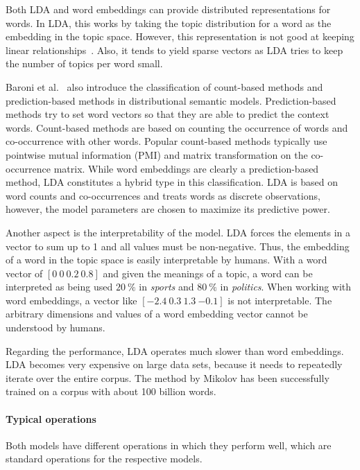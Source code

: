 \documentclass[
        a4paper,
        titlepage,
        twoside,
        parskip
        ]{scrbook}
\theoremstyle{break}
\begin{document}
Both LDA and word embeddings can provide distributed representations for words.
In LDA, this works by taking the topic distribution for a word as the embedding in the topic space.
However, this representation is not good at keeping linear relationships~\cite{Mikolov2013b,Mikolov2013a}.
Also, it tends to yield sparse vectors as LDA tries to keep the number of topics per word small.

Baroni et al.~\cite{Baroni2014} also introduce the classification of count-based methods and prediction-based methods in distributional semantic models.
Prediction-based methods try to set word vectors so that they are able to predict the context words.
Count-based methods are based on counting the occurrence of words and co-occurrence with other words.
Popular count-based methods typically use pointwise mutual information (PMI) and matrix transformation on the co-occurrence matrix.
While word embeddings are clearly a prediction-based method, LDA constitutes a hybrid type in this classification.
LDA is based on word counts and co-occurrences and treats words as discrete observations, however, the model parameters are chosen to maximize its predictive power.

Another aspect is the interpretability of the model.
LDA forces the elements in a vector to sum up to 1 and all values must be non-negative.
Thus, the embedding of a word in the topic space is easily interpretable by humans.
With a word vector of $[0~0~0.2~0.8]$ and given the meanings of a topic, a word can be interpreted as being used $20~\%$ in \emph{sports} and $80~\%$ in \emph{politics}.
When working with word embeddings, a vector like $[{-2.4}~0.3~1.3~{-0.1}]$ is not interpretable.
The arbitrary dimensions and values of a word embedding vector cannot be understood by humans.

Regarding the performance, LDA operates much slower than word embeddings.
LDA becomes very expensive on large data sets, because it needs to repeatedly iterate over the entire corpus.
The method by Mikolov has been successfully trained on a corpus with about 100 billion words.


\paragraph{Typical operations}
Both models have different operations in which they perform well, which are standard operations for the respective models.
\end{document}
